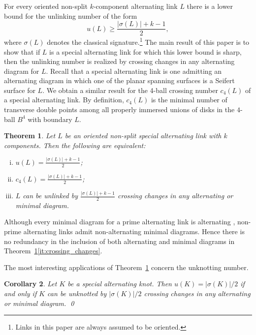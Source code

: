 \documentclass[a4paper,11pt]{amsart}
\newtheorem{thm}{Theorem}%
\newtheorem{cor}[thm]{Corollary}
\theoremstyle{definition}
\theoremstyle{remark}
\numberwithin{equation}{section}
\begin{document}
For every oriented non-split $k$-component alternating link $L$ there is a lower bound for the unlinking number of the form 
\begin{equation}\label{eq:alt_sig_bound}
u(L)\geq \frac{|\sigma(L)|+k-1}{2},
\end{equation}
where $\sigma(L)$ denotes the classical signature.\footnote{Links in this paper are always assumed to be oriented.} The main result of this paper is to show that if $L$ is a special alternating link for which this lower bound is sharp, then the unlinking number is realized by crossing changes in any alternating diagram for $L$. Recall that a special alternating link is one admitting an alternating diagram in which one of the planar spanning surfaces is a Seifert surface for $L$. We obtain a similar result for the 4-ball crossing number $c_4(L)$ of a special alternating link. By definition, $c_4(L)$ is the minimal number of transverse double points among all properly immersed unions of disks in the $4$-ball $B^4$ with boundary $L$. %
 
\begin{thm}\label{thm:main}
    Let $L$ be an oriented non-split special alternating link with $k$ components. Then the following are equivalent:
    \begin{enumerate}[(i)]
        \item\label{it:unlinking} $u(L)=\frac{|\sigma(L)|+k-1}{2}$;
        \item\label{it:c4} $c_4(L)=\frac{|\sigma(L)|+k-1}{2}$;
        \item\label{it:crossing_changes} $L$ can be unlinked by $\frac{|\sigma(L)|+k-1}{2}$ crossing changes in any alternating or minimal diagram.
    \end{enumerate}
\end{thm}
Although every minimal diagram for a prime alternating link is alternating \cite{Kauffman1987, Murasugi1987Jones, Thistlethwaite1987}, non-prime alternating links admit non-alternating minimal diagrams. Hence there is no redundancy in the inclusion of both alternating and minimal diagrams in Theorem~\ref{thm:main}\eqref{it:crossing_changes}.

The most interesting applications of Theorem~\ref{thm:main} concern the unknotting number.
\begin{cor}\label{cor:unknotting}
    Let $K$ be a special alternating knot. Then $u(K)=|\sigma(K)|/2$ if and only if $K$ can be unknotted by $|\sigma(K)|/2$ crossing changes in any alternating or minimal diagram. \qed
\end{cor}
\end{document}
